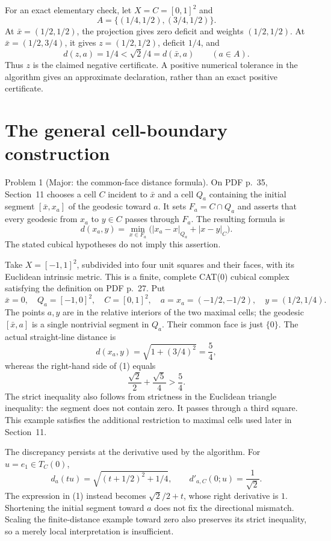 \documentclass[10pt]{article}
\begin{document}
For an exact elementary check, let \(X=C=[0,1]^2\) and \[A=\{(1/4,1/2),(3/4,1/2)\}.\] At \(\bar x=(1/2,1/2)\), the projection gives zero deficit and weights \((1/2,1/2)\). At \(\bar x=(1/2,3/4)\), it gives \(z=(1/2,1/2)\), deficit \(1/4\), and \[d(z,a)=1/4<\sqrt2/4=d(\bar x,a)\qquad(a\in A).\] Thus \(z\) is the claimed negative certificate. A positive numerical tolerance in the algorithm gives an approximate declaration, rather than an exact positive certificate.\par
\section*{The general cell-boundary construction}
Problem 1 (Major: the common-face distance formula).  On PDF p. 35, Section 11 chooses a cell \(C\) incident to \(\bar x\) and a cell \(Q_a\) containing the initial segment \([\bar x,x_a]\) of the geodesic toward \(a\). It sets \(F_a=C\cap Q_a\) and asserts that every geodesic from \(x_a\) to \(y\in C\) passes through \(F_a\). The resulting formula is \[d(x_a,y)=\min_{x\in F_a}
       \bigl(|x_a-x|_{Q_a}+|x-y|_C\bigr).                 \tag{1}\] The stated cubical hypotheses do not imply this assertion.\par
Take \(X=[-1,1]^2\), subdivided into four unit squares and their faces, with its Euclidean intrinsic metric. This is a finite, complete CAT(0) cubical complex satisfying the definition on PDF p. 27. Put \[\bar x=0,\quad Q_a=[-1,0]^2,\quad C=[0,1]^2,\quad
 a=x_a=(-1/2,-1/2),\quad y=(1/2,1/4).\] The points \(a,y\) are in the relative interiors of the two maximal cells; the geodesic \([\bar x,a]\) is a single nontrivial segment in \(Q_a\). Their common face is just \(\{0\}\). The actual straight-line distance is \[d(x_a,y)=\sqrt{1+(3/4)^2}=\frac54,\] whereas the right-hand side of (1) equals \[\frac{\sqrt2}{2}+\frac{\sqrt5}{4}>\frac54.\] The strict inequality also follows from strictness in the Euclidean triangle inequality: the segment does not contain zero. It passes through a third square. This example satisfies the additional restriction to maximal cells used later in Section 11.\par
The discrepancy persists at the derivative used by the algorithm. For \(u=e_1\in T_C(0)\), \[d_a(tu)=\sqrt{(t+1/2)^2+1/4},\qquad
 d'_{a,C}(0;u)=\frac1{\sqrt2}.\] The expression in (1) instead becomes \(\sqrt2/2+t\), whose right derivative is \(1\). Shortening the initial segment toward \(a\) does not fix the directional mismatch. Scaling the finite-distance example toward zero also preserves its strict inequality, so a merely local interpretation is insufficient.\par
\end{document}
